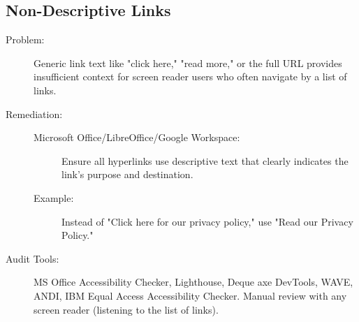 \subsection{Non-Descriptive Links}
\label{subsec:non-descriptive-links}
\begin{description}
    \item[Problem:] Generic link text like "click here," "read more," or the full URL provides insufficient context for screen reader users who often navigate by a list of links.
    \item[Remediation:]
    \begin{description}
        \item[Microsoft Office/LibreOffice/Google Workspace:] Ensure all hyperlinks use descriptive text that clearly indicates the link's purpose and destination.
        \item[Example:] Instead of "Click here for our privacy policy," use "Read our Privacy Policy."
    \end{description}
    \item[Audit Tools:] MS Office Accessibility Checker, Lighthouse, Deque axe DevTools, WAVE, ANDI, IBM Equal Access Accessibility Checker. Manual review with any screen reader (listening to the list of links).
\end{description}

